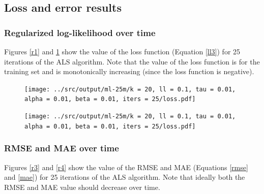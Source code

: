 \documentclass{article}
\begin{document}
\subsection{Loss and error results}

\subsubsection{Regularized log-likelihood over time}
Figures \ref{r1} and \ref{r2} show the value of the loss function (Equation \ref{ll3}) for 25 iterations of the ALS algorithm.
Note that the value of the loss function is for the training set and is monotonically increasing (since the loss function is negative).

\begin{figure}[h!]
    \centering
    \begin{minipage}{.5\textwidth}
      \centering
      \captionsetup{justification=centering}
      \texttt{[image: ../src/output/ml-25m/k = 20, ll = 0.1, tau = 0.01, alpha = 0.01, beta = 0.01, iters = 25/loss.pdf]}
      \label{r1}
    \end{minipage}%
    \begin{minipage}{.5\textwidth}
      \centering
      \captionsetup{justification=centering}
      \texttt{[image: ../src/output/ml-25m/k = 20, ll = 0.1, tau = 0.01, alpha = 0.01, beta = 0.01, iters = 25/loss.pdf]}
      \label{r2}
    \end{minipage}
\end{figure}

\subsubsection{RMSE and MAE over time}
Figures \ref{r3} and \ref{r4} show the value of the RMSE and MAE (Equations \ref{rmse} and \ref{mae}) for 25 iterations of the ALS algorithm.
Note that ideally both the RMSE and MAE value should decrease over time.
\end{document}
